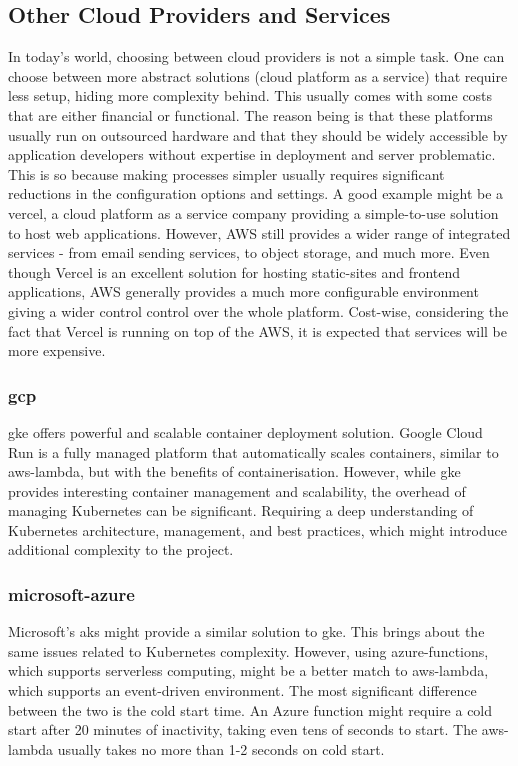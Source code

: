 \subsection{Other Cloud Providers and Services}
\label{subsec:other-cloud-providers}
In today's world, choosing between cloud providers is not a simple task.
One can choose between more abstract solutions (cloud platform as a service) that require less setup, hiding more complexity behind.
This usually comes with some costs that are either financial or functional.
The reason being is that these platforms usually run on outsourced hardware and that they should be widely accessible by application developers without expertise in deployment and server problematic. 
This is so because making processes simpler usually requires significant reductions in the configuration options and settings. 
A good example might be a \gls{vercel}, a cloud platform as a service company providing a simple-to-use solution to host web applications.
However, AWS still provides a wider range of integrated services - from email sending services, to object storage, and much more.
Even though Vercel is an excellent solution for hosting static-sites and frontend applications, AWS generally provides a much more configurable environment giving a wider control control over the whole platform.
Cost-wise, considering the fact that Vercel is running on top of the AWS, it is expected that services will be more expensive.

\subsubsection{\gls{gcp}}
\gls{gke} offers powerful and scalable container deployment solution.
Google Cloud Run is a fully managed platform that automatically scales containers, similar to \gls{aws-lambda}, but with the benefits of containerisation. 
However, while \gls{gke} provides interesting container management and scalability, the overhead of managing Kubernetes can be significant.
Requiring a deep understanding of Kubernetes architecture, management, and best practices, which might introduce additional complexity to the project.

\subsubsection{\gls{microsoft-azure}}
Microsoft's \gls{aks} might provide a similar solution to \gls{gke}.
This brings about the same issues related to Kubernetes complexity.
However, using \gls{azure-functions}, which supports serverless computing, might be a better match to \gls{aws-lambda}, which supports an event-driven environment.
The most significant difference between the two is the cold start time.
An Azure function might require a cold start after 20 minutes of inactivity, taking even tens of seconds to start.
The \gls{aws-lambda} usually takes no more than 1-2 seconds on cold start.


